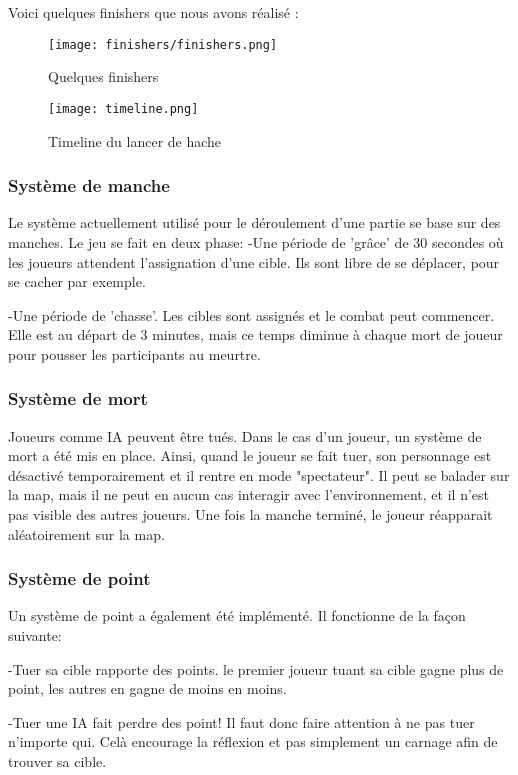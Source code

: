 Voici quelques finishers que nous avons réalisé :

\begin{figure}[hbt!]
    \centering
    \texttt{[image: finishers/finishers.png]}
    \caption{Quelques finishers}
\end{figure}

\FloatBarrier
\begin{figure}[hbt!]
    \centering
    \texttt{[image: timeline.png]}
    \caption{Timeline du lancer de hache}
\end{figure}


\subsubsection{Système de manche}
    Le système actuellement utilisé pour le déroulement d'une partie se base sur des manches. Le jeu se fait en deux phase:
    	-Une période de 'grâce' de 30 secondes où les joueurs attendent l'assignation d'une cible. 
	 Ils sont libre de se déplacer, pour se cacher par exemple.

	-Une période de 'chasse'. Les cibles sont assignés et le combat peut commencer. Elle est au départ de 3 minutes, mais ce temps
	 diminue à chaque mort de joueur pour pousser les participants au meurtre.

\subsubsection{Système de mort}
    Joueurs comme IA peuvent être tués. Dans le cas d'un joueur, un système de mort a été mis en place. Ainsi,
    quand le joueur se fait tuer, son personnage est désactivé temporairement et il rentre
    en mode "spectateur". Il peut se balader sur la map, mais il ne peut en aucun cas interagir avec l'environnement,
    et il n'est pas visible des autres joueurs. Une fois la manche terminé, le joueur réapparait aléatoirement sur la map.

\subsubsection{Système de point}
    Un système de point a également été implémenté. Il fonctionne de la façon suivante:
    
	-Tuer sa cible rapporte des points. le premier joueur tuant sa cible gagne plus de point, les autres en gagne de moins en moins.
	
	-Tuer une IA fait perdre des point! Il faut donc faire attention à ne pas tuer n'importe qui. Celà encourage la réflexion et pas 	 simplement un carnage afin de trouver sa cible.
	
